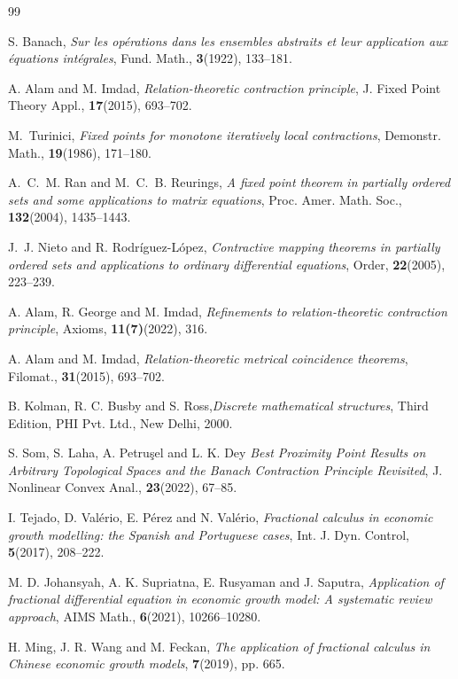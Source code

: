 \documentclass[10pt, reqno]{amsart}
\theoremstyle{definition}
\theoremstyle{remark}
\numberwithin{equation}{section}
\begin{document}
\begin{thebibliography}{99}


	 S. Banach, { \it Sur les op\'{e}rations dans les ensembles abstraits et leur application aux \'{e}quations int\'{e}grales}, {Fund. Math.}, {\bf 3}({1922}), 133--181.
	
	
	 A. Alam and M. Imdad,  {\it Relation-theoretic contraction principle}, {J. Fixed Point Theory Appl.}, {\bf 17}(2015), 693--702.
	
	M.~Turinici, \emph{Fixed points for monotone iteratively local contractions}, Demonstr. Math., {\bf 19}({1986}), 171--180.
	
	A.~C.~M. Ran and M.~C.~B. Reurings, \emph{A fixed point theorem in partially ordered sets and some applications to matrix equations}, Proc. Amer. Math. Soc., {\bf 132}({2004}), 1435--1443.
	
	J.~J. Nieto and R. Rodr{\'i}guez-L{\'o}pez, \emph{Contractive mapping theorems in partially ordered sets and applications to ordinary differential equations}, Order, {\bf 22}({2005}), 223--239.
	
    A. Alam, R. George and M. Imdad,  {\it  Refinements to relation-theoretic contraction principle}, {Axioms}, {\bf 11(7)}(2022), 316.
	
	
    A. Alam and M. Imdad,  {\it  Relation-theoretic metrical coincidence theorems}, {Filomat.,} {\bf 31}(2015), 693--702.
	
	B. Kolman, R. C. Busby and S. Ross,\emph{Discrete mathematical structures}, Third Edition, PHI Pvt. Ltd., New Delhi, 2000.
	
	
    S. Som, S. Laha, A. Petruşel  and L. K. Dey 
    \emph{Best Proximity Point Results on Arbitrary Topological Spaces and the Banach Contraction Principle Revisited}, {J. Nonlinear Convex Anal.},   \textbf{23}(2022), 67--85.   


	I. Tejado, D. Valério, E. Pérez and N. Valério,  
     {\it Fractional calculus in economic growth modelling: the Spanish and Portuguese cases}, {Int. J. Dyn. Control}, \textbf{5}(2017), 208--222. 
	
	
    
	M. D. Johansyah, A. K. Supriatna, E. Rusyaman and  J. Saputra,
	{\it Application of fractional differential equation in economic growth model: A systematic review approach}, { AIMS Math.}, \textbf{6}(2021),  10266--10280. 

        
	H. Ming,  J. R. Wang and  M. Feckan,
	{ \it The application of fractional calculus in Chinese economic growth models},
	 \textbf{7}(2019), pp. 665.
    
\end{thebibliography} 
\end{document}
